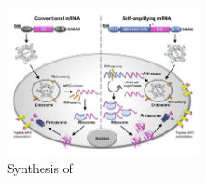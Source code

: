 \documentclass{article}
\begin{document}
            \begin{figure}
                \centering
                \includegraphics[width=0.5\textwidth]{imgs/mRNA_action.JPG}
                \caption{Synthesis of \autocite{MRNATransformativeTechnology}}
                \label{fig:mRNAtypesnext}
            \end{figure}










\end{document}
